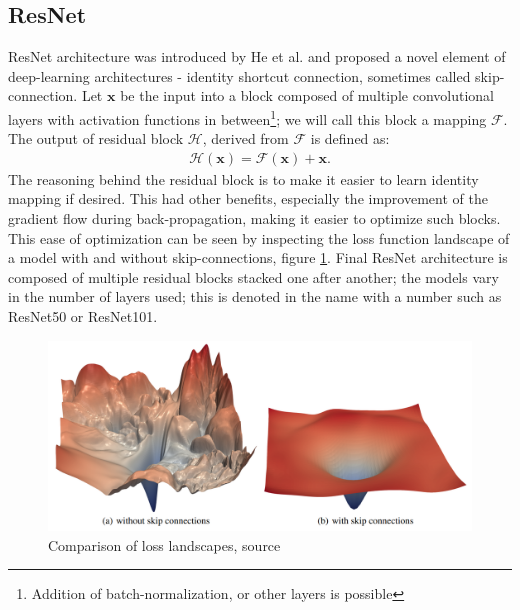 \subsection{ResNet}
ResNet architecture was introduced by He et al. \cite{He2015} and proposed a novel element of deep-learning architectures - identity shortcut connection, sometimes called skip-connection. Let $\mathbf{x}$ be the input into a block composed of multiple convolutional layers with activation functions in between\footnote{Addition of batch-normalization, or other layers is possible}; we will call this block a mapping $\mathcal{F}$. The output of residual block $\mathcal{H}$, derived from $\mathcal{F}$ is defined as:
\begin{align}
    \mathcal{H}\left(\mathbf{x}\right) = \mathcal{F} \left(\mathbf{x}\right) + \mathbf{x}.
\end{align}
The reasoning behind the residual block is to make it easier to learn identity mapping if desired. This had other benefits, especially the improvement of the gradient flow during back-propagation, making it easier to optimize such blocks. This ease of optimization can be seen by inspecting the loss function landscape of a model with and without skip-connections, figure \ref{fig:resnet_loss}.
Final ResNet architecture is composed of multiple residual blocks stacked one after another; the models vary in the number of layers used; this is denoted in the name with a number such as ResNet50 or ResNet101.

\begin{figure}
    \centering
    \includegraphics[width=\linewidth]{images/resnet_loss.png}
    \caption{Comparison of loss landscapes, source \cite{Li2017}}
    \label{fig:resnet_loss}
\end{figure}

